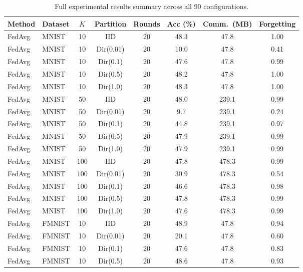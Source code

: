 \begin{table}[t]
\centering
\caption{Full experimental results summary across all 90 configurations.}
\label{tab:full_results}
\renewcommand{\arraystretch}{1.1}
\small
\begin{tabular}{llcccccc}
\toprule
\textbf{Method} & \textbf{Dataset} & \textbf{$K$}
 & \textbf{Partition} & \textbf{Rounds}
 & \textbf{Acc (\%)} & \textbf{Comm.\ (MB)} & \textbf{Forgetting} \\
\midrule
FedAvg & MNIST    &  10 & IID       & 20 &  48.3 &   47.8 & 1.00 \\
FedAvg & MNIST    &  10 & Dir(0.01) & 20 &  10.0 &   47.8 & 0.41 \\
FedAvg & MNIST    &  10 & Dir(0.1)  & 20 &  47.6 &   47.8 & 0.99 \\
FedAvg & MNIST    &  10 & Dir(0.5)  & 20 &  48.2 &   47.8 & 1.00 \\
FedAvg & MNIST    &  10 & Dir(1.0)  & 20 &  48.3 &   47.8 & 1.00 \\
FedAvg & MNIST    &  50 & IID       & 20 &  48.0 &  239.1 & 0.99 \\
FedAvg & MNIST    &  50 & Dir(0.01) & 20 &   9.7 &  239.1 & 0.24 \\
FedAvg & MNIST    &  50 & Dir(0.1)  & 20 &  44.8 &  239.1 & 0.97 \\
FedAvg & MNIST    &  50 & Dir(0.5)  & 20 &  47.9 &  239.1 & 0.99 \\
FedAvg & MNIST    &  50 & Dir(1.0)  & 20 &  47.9 &  239.1 & 0.99 \\
FedAvg & MNIST    & 100 & IID       & 20 &  47.8 &  478.3 & 0.99 \\
FedAvg & MNIST    & 100 & Dir(0.01) & 20 &  30.9 &  478.3 & 0.54 \\
FedAvg & MNIST    & 100 & Dir(0.1)  & 20 &  46.6 &  478.3 & 0.98 \\
FedAvg & MNIST    & 100 & Dir(0.5)  & 20 &  47.8 &  478.3 & 0.99 \\
FedAvg & MNIST    & 100 & Dir(1.0)  & 20 &  47.6 &  478.3 & 0.99 \\
\midrule
FedAvg & FMNIST   &  10 & IID       & 20 &  48.9 &   47.8 & 0.94 \\
FedAvg & FMNIST   &  10 & Dir(0.01) & 20 &  20.1 &   47.8 & 0.60 \\
FedAvg & FMNIST   &  10 & Dir(0.1)  & 20 &  47.6 &   47.8 & 0.83 \\
FedAvg & FMNIST   &  10 & Dir(0.5)  & 20 &  48.6 &   47.8 & 0.93 \\

\end{tabular}
\end{table}
